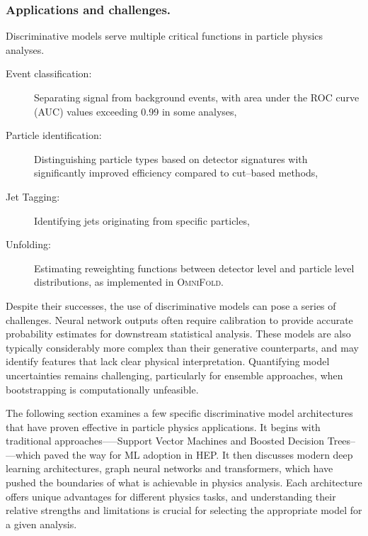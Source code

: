             \subsubsection{Applications and challenges.}
                Discriminative models serve multiple critical functions in particle physics analyses.
                \begin{description}
                    \item[Event classification:] Separating signal from background events, with area under the ROC curve (AUC) values exceeding 0.99 in some analyses,
                    \item[Particle identification:] Distinguishing particle types based on detector signatures with significantly improved efficiency compared to cut--based methods,
                    \item[Jet Tagging:] Identifying jets originating from specific particles,
                    \item[Unfolding:] Estimating reweighting functions between detector level and particle level distributions, as implemented in \textsc{OmniFold}.
                \end{description}
                
                Despite their successes, the use of discriminative models can pose a series of challenges.
                Neural network outputs often require calibration to provide accurate probability estimates for downstream statistical analysis.
                These models are also typically considerably more complex than their generative counterparts, and may identify features that lack clear physical interpretation.
                Quantifying model uncertainties remains challenging, particularly for ensemble approaches, when bootstrapping is computationally unfeasible.
                
                The following section examines a few specific discriminative model architectures that have proven effective in particle physics applications.
                It begins with traditional approaches—--Support Vector Machines and Boosted Decision Trees--—which paved the way for ML adoption in HEP.
                It then discusses modern deep learning architectures, graph neural networks and transformers, which have pushed the boundaries of what is achievable in physics analysis.
                Each architecture offers unique advantages for different physics tasks, and understanding their relative strengths and limitations is crucial for selecting the appropriate model for a given analysis.
                
